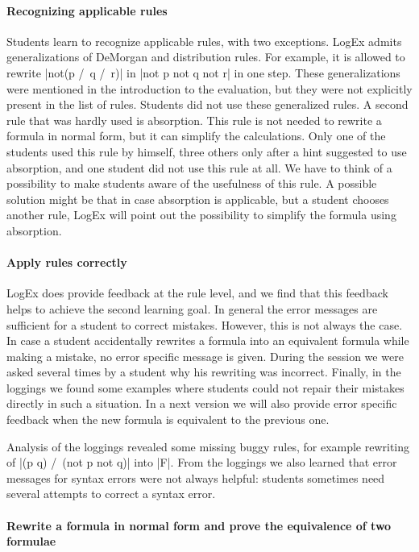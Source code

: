 \documentclass[a4paper,UKenglish]{lipics}
\begin{document}
\paragraph*{Recognizing applicable rules}
Students learn to recognize applicable rules, with two exceptions. LogEx admits
generalizations of DeMorgan and distribution rules. For example, it is allowed to
rewrite |not(p /\ q /\ r)| in |not p \/ not q \/ not r| in one step. These
generalizations were mentioned in the introduction to the evaluation, but they were not explicitly
present in the list of rules. Students did not use these generalized rules. A
second rule that was hardly used is absorption. This rule is not needed to
rewrite a formula in normal form, but it can simplify the calculations. Only one
of the students used this rule by himself, three others only after a hint
suggested to use absorption, and one student did not use this rule at all. We
have to think of a possibility to make students aware of the usefulness of this
rule. A possible solution might be that in case absorption is applicable,
but a student chooses another rule, LogEx will point out the possibility to
simplify the formula using absorption.

\paragraph*{Apply rules correctly}
LogEx does provide feedback at the rule level, and we find that this feedback
helps to achieve the second learning goal. In general the error
messages are sufficient for a student to correct mistakes. However, this is not
always the case. In case a student accidentally rewrites a formula into an
equivalent formula while making a mistake, no error specific message is given.
During the session we were asked several times by a student why his rewriting
was incorrect. Finally, in the loggings we found some examples where students
could not repair their mistakes directly in such a situation. In a next version
we will also provide error specific feedback when the new formula is equivalent
to the previous one.

Analysis of the loggings revealed some missing buggy rules, for example
rewriting of |(p \/ q) /\ (not p \/ not q)| into |F|.
From the loggings we also learned that error messages for syntax errors were not
always helpful: students sometimes need several attempts to correct a syntax
error.


\paragraph*{Rewrite a formula in normal form and prove the equivalence of two formulae}
\end{document}
